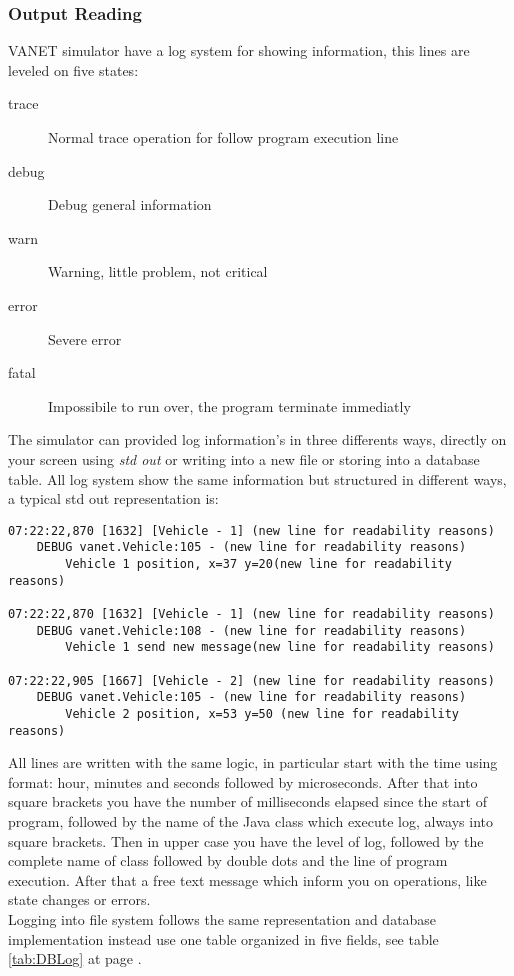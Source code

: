 \subsubsection{Output Reading}
VANET simulator have a log system for showing information, this lines are leveled on five states:
\begin{description}
	\item [trace] Normal trace operation for follow program execution line
	\item [debug] Debug general information
	\item [warn] Warning, little problem, not critical
	\item [error] Severe error
	\item [fatal] Impossibile to run over, the program terminate immediatly
\end{description}
The simulator can provided log  information's in three differents ways, directly on your screen using \textit{std out} or writing into a new file or storing into a database table. All log system show the same information but structured in different ways, a typical std out representation is:
\begin{verbatim}
07:22:22,870 [1632] [Vehicle - 1] (new line for readability reasons)
	DEBUG vanet.Vehicle:105 - (new line for readability reasons)
		Vehicle 1 position, x=37 y=20(new line for readability reasons)
		
07:22:22,870 [1632] [Vehicle - 1] (new line for readability reasons)
	DEBUG vanet.Vehicle:108 - (new line for readability reasons)
		Vehicle 1 send new message(new line for readability reasons)
		
07:22:22,905 [1667] [Vehicle - 2] (new line for readability reasons)
	DEBUG vanet.Vehicle:105 - (new line for readability reasons)
		Vehicle 2 position, x=53 y=50 (new line for readability reasons)
\end{verbatim}
All lines are written with the same logic, in particular start with the time using format: hour, minutes and seconds followed by microseconds. After that into square brackets you have the number of milliseconds elapsed since the start of program, followed by the name of the Java class which execute log, always into square brackets. Then in upper case you have the level of log, followed by the complete name of class followed by double dots and the line of program execution. After that a free text message which inform you on operations, like state changes or errors.\\
Logging into file system follows the same representation and database implementation instead use one table organized in five fields, see table \ref{tab:DBLog} at page \pageref{tab:DBLog}.
